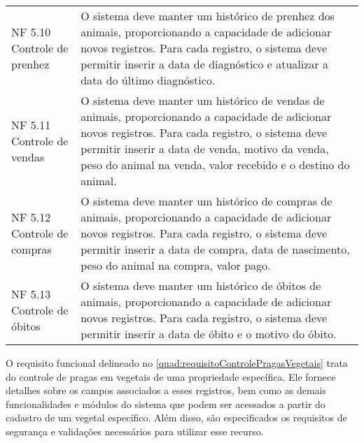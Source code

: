 \begin{tabframed}[htb]
\begin{tabular}{|l|l|}
    NF 5.10 Controle de prenhez               &
    \multicolumn{1}{|p{8cm}|}{\raggedright O sistema deve manter um histórico de prenhez dos animais, proporcionando a capacidade de adicionar novos registros. Para cada registro, o sistema deve permitir inserir a data de diagnóstico e atualizar a data do último diagnóstico.}
    \\ \cline{1-2}

    NF 5.11 Controle de vendas                &
    \multicolumn{1}{|p{8cm}|}{\raggedright O sistema deve manter um histórico de vendas de animais, proporcionando a capacidade de adicionar novos registros. Para cada registro, o sistema deve permitir inserir a data de venda, motivo da venda, peso do animal na venda, valor recebido e o destino do animal.}
    \\ \cline{1-2}

    NF 5.12 Controle de compras               &
    \multicolumn{1}{|p{8cm}|}{\raggedright O sistema deve manter um histórico de compras de animais, proporcionando a capacidade de adicionar novos registros. Para cada registro, o sistema deve permitir inserir a data de compra, data de nascimento, peso do animal na compra, valor pago.}
    \\ \cline{1-2}

    NF 5.13 Controle de óbitos                &
    \multicolumn{1}{|p{8cm}|}{\raggedright O sistema deve manter um histórico de óbitos de animais, proporcionando a capacidade de adicionar novos registros. Para cada registro, o sistema deve permitir inserir a data de óbito e o motivo do óbito.}
    \\ \cline{1-2}
  \end{tabular}
  \fonte{} %
\end{tabframed}

O requisito funcional delineado no \autoref{quad:requisitoControlePragasVegetais} trata do controle de pragas em vegetais de uma propriedade específica. Ele fornece detalhes sobre os campos associados a esses registros, bem como as demais funcionalidades e módulos do sistema que podem ser acessados a partir do cadastro de um vegetal específico. Além disso, são especificados os requisitos de segurança e validações necessários para utilizar esse recurso.

